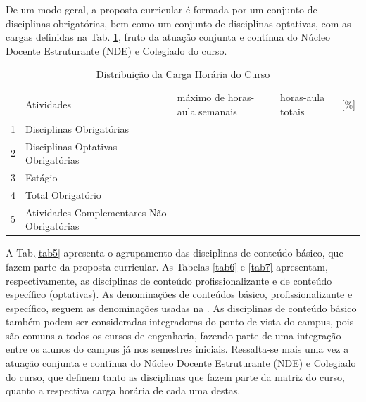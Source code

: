 De um modo geral, a proposta curricular é formada por um conjunto de disciplinas obrigatórias, bem como um conjunto de disciplinas optativas, com as cargas definidas na Tab. \ref{tab4}, fruto da atuação conjunta e contínua do Núcleo Docente Estruturante (NDE) e Colegiado do curso.

\clearpage
\thispagestyle{empty}
\begin{longtable}{|p{0.3cm}|p{7.1cm}|p{2.7cm}|p{1.8cm}|p{1.0cm}|}
	\caption{Distribuição da Carga Horária do Curso}\label{tab4}
	
	\vspace{-0.25cm} \\
	\hline 
	\cellcolor{\cinza} & \cellcolor{\cinza}Atividades & \cellcolor{\cinza}máximo de horas-aula semanais & \cellcolor{\cinza}horas-aula totais & \cellcolor{\cinza}[\%] \\ 
	\hline
	1 &  Disciplinas Obrigatórias  &  \CHTOTALDOBSE  &  \CHTOTALDOB & \CHTOTALDOBPE \\ \hline
	2 &  Disciplinas Optativas Obrigatórias  &  \CHOPTMINSE  &  \CHOPTMIN & \CHOPTMINPE \\ \hline
	3 &  Estágio  &  \CHESTAGIOSE  &  \CHESTAGIO & \CHESTAGIOPE \\ \hline
	4 &  Total Obrigatório  &  \CHTOTALOBSE  &  \CHTOTALOB & \CHTOTALOBPE \\ \hline

	5 &  Atividades Complementares Não Obrigatórias &  \CHCOMPSE  &  \CHCOMP & \CHCOMPPE \\ \hline

\end{longtable}

A Tab.\ref{tab5} apresenta o agrupamento das disciplinas de conteúdo básico, que fazem parte da proposta curricular. As Tabelas \ref{tab6} e \ref{tab7} apresentam, respectivamente, as disciplinas de conteúdo profissionalizante e de conteúdo específico (optativas). As denominações de conteúdos básico, profissionalizante e específico, seguem as denominações usadas na . As disciplinas de conteúdo básico também podem ser consideradas integradoras do ponto de vista do campus, pois são comuns a todos os cursos de engenharia, fazendo parte de uma integração entre os alunos do campus já nos semestres iniciais. Ressalta-se mais uma vez a atuação conjunta e contínua do Núcleo Docente Estruturante (NDE) e Colegiado do curso, que definem tanto as disciplinas que fazem parte da matriz do curso, quanto a respectiva carga horária de cada uma destas.

